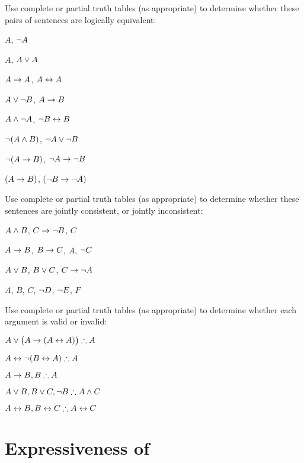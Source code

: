 \practiceproblems



\problempart
\label{pr.TT.equiv}
Use complete or partial truth tables (as appropriate) to determine whether these pairs of sentences are logically equivalent:
\begin{earg}
\item $A$, $\neg A$ %
\item $A$, $A \vee A$ %
\item $A\rightarrow A$, $A \leftrightarrow A$ %
\item $A \vee \neg B$, $A\rightarrow B$ %
\item $A \wedge \neg A$, $\neg B \leftrightarrow B$ %
\item $\neg(A \wedge B)$, $\neg A \vee \neg B$ %
\item $\neg(A \rightarrow B)$, $\neg A \rightarrow \neg B$ %
\item $(A \rightarrow B)$, $(\neg B \rightarrow \neg A)$ %
\end{earg}


\problempart
\label{pr.TT.consistent.partial}
Use complete or partial truth tables (as appropriate) to determine whether these sentences are jointly consistent, or jointly inconsistent:
\begin{earg}
\item $A \wedge B$, $C\rightarrow \neg B$, $C$ %
\item $A\rightarrow B$, $B\rightarrow C$, $A$, $\neg C$ %
\item $A \vee B$, $B\vee C$, $C\rightarrow \neg A$ %
\item $A$, $B$, $C$, $\neg D$, $\neg E$, $F$ %
\end{earg}


\problempart
\label{pr.TT.valid.partial}
Use complete or partial truth tables (as appropriate) to determine whether each argument is valid or invalid:
\begin{earg}
\item $A\vee\bigl(A\rightarrow(A\leftrightarrow A) \bigr) \mathrel{\therefore} A$ %
\item $A\leftrightarrow\neg(B\leftrightarrow A) \mathrel{\therefore} A$ %
\item $A\rightarrow B, B \mathrel{\therefore} A$ %
\item $A\vee B, B\vee C, \neg B \mathrel{\therefore} A \wedge C$ %
\item $A\leftrightarrow B, B\leftrightarrow C \mathrel{\therefore} A\leftrightarrow C$ %
\end{earg}

\chapter{Expressiveness of \textnormal{\TFL}}\label{s:expressiveness} 

